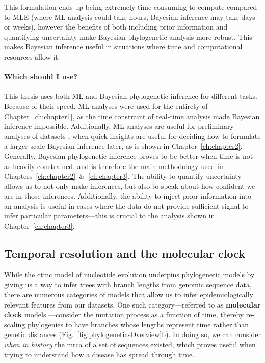This formulation ends up being extremely time consuming to compute compared to MLE (where ML analysis could take hours, Bayesian inference may take days or weeks), however the benefits of both including prior information and quantifying uncertainty make Bayesian phylogenetic analysis more robust.
This makes Bayesian inference useful in situations where time and computational resources allow it.

\paragraph*{Which should I use?}
This thesis uses both ML and Bayesian phylogenetic inference for different tasks.
Because of their speed, ML analyses were used for the entirety of Chapter~\ref{ch:chapter1}, as the time constraint of real-time analysis made Bayesian inference impossible.
Additionally, ML analyses are useful for preliminary analyses of datasets \citep{holtz2024emergence}, when quick insights are useful for deciding how to formulate a larger-scale Bayesian inference later, as is shown in Chapter~\ref{ch:chapter2}.
Generally, Bayesian phylogenetic inference proves to be better when time is not as heavily constrained, and is therefore the main methodology used in Chapters~\ref{ch:chapter2}~\&~\ref{ch:chapter3}.
The ability to quantify uncertainty allows us to not only make inferences, but also to speak about how confident we are in those inferences.
Additionally, the ability to inject prior information into an analysis is useful in cases where the data do not provide sufficient signal to infer particular parameters---this is crucial to the analysis shown in Chapter~\ref{ch:chapter3}.

\subsection{Temporal resolution and the molecular clock}\label{ssec:molClock}
While the \gls{ctmc} model of nucleotide evolution underpins phylogenetic models by giving us a way to infer trees with branch lengths from genomic sequence data, there are numerous categories of models that allow us to infer epidemiologically relevant features from our datasets.
One such category---referred to as \textbf{molecular clock} models \citep{hasegawa1985dating}---consider the mutation process as a function of time, thereby re-scaling phylogenies to have branches whose lengths represent time rather than genetic distances (Fig.~\ref{fig:phylogeneticsOverview}b).
In doing so, we can consider \textit{when in history} the \gls{mrca} of a set of sequences existed, which proves useful when trying to understand how a disease has spread through time.

